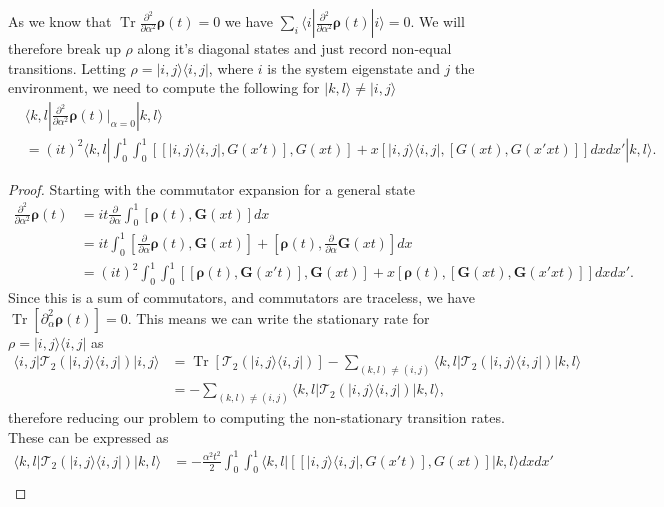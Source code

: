 \documentclass[
 amsmath,amssymb,
 aps,
onecolumn, 
nofootinbib]{revtex4-2}
\newcommand{\ket}[1]{|#1\rangle}
\newcommand{\bra}[1]{\langle #1|}
\newcommand{\ketbra}[2]{| #1\rangle\! \langle #2|}
\DeclareMathOperator{\Tr}{Tr}
\begin{document}
As we know that $\Tr \frac{\partial^2}{\partial \alpha^2} \boldsymbol{\rho}(t) = 0$ we have $\sum_i \bra{i} \frac{\partial^2}{\partial \alpha^2} \boldsymbol{\rho}(t) \ket{i} = 0$. We will therefore break up $\rho$ along it's diagonal states and just record non-equal transitions. Letting $\rho = \ketbra{i,j}{i,j}$, where $i$ is the system eigenstate and $j$ the environment, we need to compute the following for $\ket{k,l} \neq \ket{i,j}$
\begin{align}
    &\bra{k, l} \frac{\partial^2}{\partial \alpha^2} \boldsymbol{\rho}(t)\bigg|_{\alpha = 0} \ket{k,l} \\
    &= (i t)^2 \bra{k,l} \int_0^1 \int_0^1 [[\ketbra{i,j}{i,j}, G(x' t)] , G(x t)] + x [\ketbra{i,j}{i,j}, [G(x t), G(x' x t)]] dx dx' \ket{k,l}.
\end{align}
\begin{proof}
    Starting with the commutator expansion for a general state
    \begin{align}
        \frac{\partial^2}{\partial \alpha^2} \boldsymbol{\rho}(t) &= it \frac{\partial}{\partial \alpha} \int_0^1 [\boldsymbol{\rho}(t), \boldsymbol{G}(x t)] d x \\
        &= it \int_0^1 \left[\frac{\partial}{\partial \alpha} \boldsymbol{\rho}(t), \boldsymbol{G}(xt)  \right] + \left[\boldsymbol{\rho}(t), \frac{\partial}{\partial \alpha} \boldsymbol{G}(x t)\right] dx \\
        &= (i t)^2 \int_0^1 \int_0^1 [[\boldsymbol{\rho}(t), \boldsymbol{G}(x' t)], \boldsymbol{G}(x t)] + x [\boldsymbol{\rho}(t), [\boldsymbol{G}(x t), \boldsymbol{G}(x' x t)]] dx dx'. \label{eq:second_order_derivative_new_1}
    \end{align}
    Since this is a sum of commutators, and commutators are traceless, we have $\Tr [\partial_\alpha^2 \boldsymbol{\rho}(t) ] = 0$. This means we can write the stationary rate for $\rho = \ketbra{i,j}{i,j}$ as 
    \begin{align}
        \bra{i,j} \mathcal{T}_2 (\ketbra{i,j}{i,j}) \ket{i,j} &= \Tr[\mathcal{T}_2(\ketbra{i,j}{i,j})] - \sum_{(k,l) \neq (i,j)} \bra{k,l} \mathcal{T}_2 (\ketbra{i,j}{i,j}) \ket{k,l} \\
        &= - \sum_{(k,l) \neq (i,j)} \bra{k,l} \mathcal{T}_2 (\ketbra{i,j}{i,j}) \ket{k,l},
    \end{align}
    therefore reducing our problem to computing the non-stationary transition rates. These can be expressed as
    \begin{align}
        \bra{k,l} \mathcal{T}_2(\ketbra{i, j}{i, j}) \ket{k,l} &= - \frac{\alpha^2 t^2}{2} \int_0^1 \int_0^1 \bra{k, l} [[\ketbra{i,j}{i,j}, G(x' t)], G(x t)] \ket{k,l} dx dx' \\

\end{align}
\end{proof}
\end{document}
